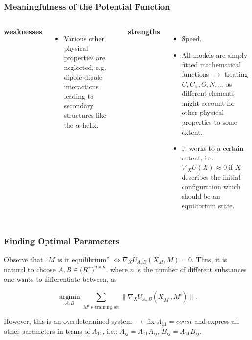 \documentclass{beamer}
\begin{document}

\begin{frame}
\frametitle{Meaningfulness of the Potential Function}
\begin{columns}[t]

\textbf{weaknesses}
\begin{itemize}
	\item Various other physical properties are neglected, e.g. dipole-dipole interactions leading to secondary structures like the $\alpha$-helix.
\end{itemize}

\textbf{strengths}
\begin{itemize}
	\item<2-> Speed.
	\item<3-> All models are simply fitted mathematical functions $\rightarrow$ treating $C,C_\alpha,O,N,\dots$ as different elements might account for other physical properties to some extent.
	\item<4-> It works to a certain extent, i.e. $\nabla_X U(X)\approx 0$ if $X$ describes the initial configuration which should be an equilibrium state.
\end{itemize}

\end{columns}


\end{frame}


\begin{frame}
\frametitle{Finding Optimal Parameters}
Observe that ``$M$ is in equilibrium'' $\Leftrightarrow \nabla_X U_{A,B}(X_M,M)=0$.
Thus, it is natural to choose $A,B \in\mathbb (R^+)^{n\times n}$, where $n$ is the number of different substances one wants to differentiate between, as

$$\underset{A,B}{\operatorname{argmin}} \sum_{M^i\in\text{training set}}\|\nabla_X U_{A,B}(X_{M^i},M^i)\|.$$

However, this is an overdetermined system $\rightarrow$ fix $A_{11} = \textit{const}$ and express all other parameters in terms of $A_{11}$, i.e.: $\tilde A_{ij} = A_{11}A_{ij}$, $\tilde B_{ij} = A_{11}B_{ij}$.

\end{frame}

\end{document}
